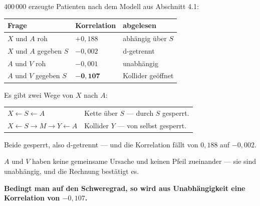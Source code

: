 \begin{merksatz}
$400\,000$ erzeugte Patienten nach dem Modell aus Abschnitt 4.1:

\begin{center}
{\small
\renewcommand{\arraystretch}{1.5}
\begin{tabular}{@{}P{2.6cm}P{2.4cm}P{3.0cm}@{}}
\toprule
\textbf{Frage} & \textbf{Korrelation} & \textbf{abgelesen}\\
\midrule
$X$ und $A$ roh & $+0{,}188$ & abhängig über $S$\\
$X$ und $A$ gegeben $S$ & $-0{,}002$ & \textcolor{gruen}{d-getrennt}\\
$A$ und $V$ roh & $-0{,}001$ & \textcolor{gruen}{unabhängig}\\
$A$ und $V$ gegeben $S$ & $\mathbf{-0{,}107}$ & \textcolor{akzent}{Kollider geöffnet}\\
\bottomrule
\end{tabular}}
\end{center}

Es gibt zwei Wege von $X$ nach $A$:
\begin{center}
{\small
\renewcommand{\arraystretch}{1.48}
\begin{tabular}{@{}P{3.4cm}P{4.6cm}@{}}
\toprule
$X \leftarrow S \leftarrow A$ & Kette über $S$ --- durch $S$ gesperrt.\\
$X \leftarrow S \to M \to Y \leftarrow A$ & Kollider $Y$ --- von selbst gesperrt.\\
\bottomrule
\end{tabular}}
\end{center}
Beide gesperrt, also d-getrennt --- und die Korrelation fällt von $0{,}188$ auf $-0{,}002$. \checkmark

$A$ und $V$ haben keine gemeinsame Ursache und keinen Pfeil zueinander --- sie sind unabhängig, und die Rechnung bestätigt es.

\begin{center}
\begin{minipage}{0.9\textwidth}
\textbf{Bedingt man auf den Schweregrad, so wird aus Unabhängigkeit eine Korrelation von $-0{,}107$.}
\end{minipage}
\end{center}

\begin{center}
\begin{minipage}{0.88\textwidth}
\end{minipage}
\end{center}
\end{merksatz}

